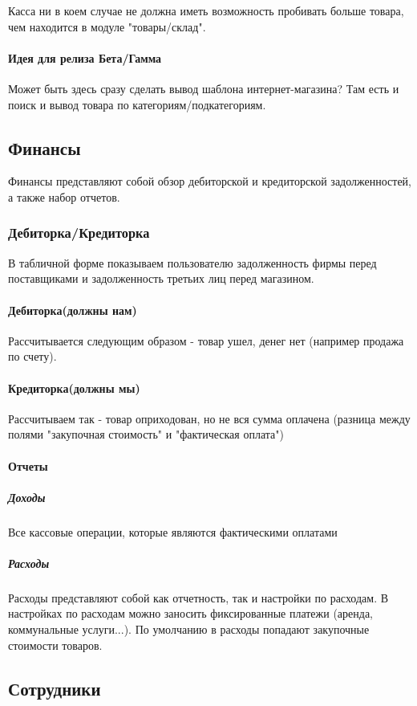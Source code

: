 \documentclass[DIV=calc, paper=a4, fontsize=11pt]{scrartcl} %
\begin{document}
Касса ни в коем случае не должна иметь возможность пробивать больше товара, чем находится в модуле "товары/склад".
\paragraph{Идея для релиза Бета/Гамма}
Может быть здесь сразу сделать вывод шаблона интернет-магазина? Там есть и поиск и вывод товара по категориям/подкатегориям.

\subsection{Финансы}

Финансы представляют собой обзор дебиторской и кредиторской задолженностей, а также набор отчетов.

\subsubsection{Дебиторка/Кредиторка}

В табличной форме показываем пользователю задолженность фирмы перед поставщиками и задолженность третьих лиц перед магазином.

\paragraph{Дебиторка(должны нам)}
Рассчитывается следующим образом - товар ушел, денег нет (например продажа по счету).

\paragraph{Кредиторка(должны мы)}
Рассчитываем так - товар оприходован, но не вся сумма оплачена (разница между полями "закупочная стоимость" и "фактическая оплата")

\paragraph{Отчеты}
\subparagraph{Доходы}
Все кассовые операции, которые являются фактическими оплатами

\subparagraph{Расходы}
Расходы представляют собой как отчетность, так и настройки по расходам. В настройках по расходам можно заносить фиксированные платежи (аренда, коммунальные услуги...). По умолчанию в расходы попадают закупочные стоимости товаров.

\subsection{Сотрудники}
\end{document}
